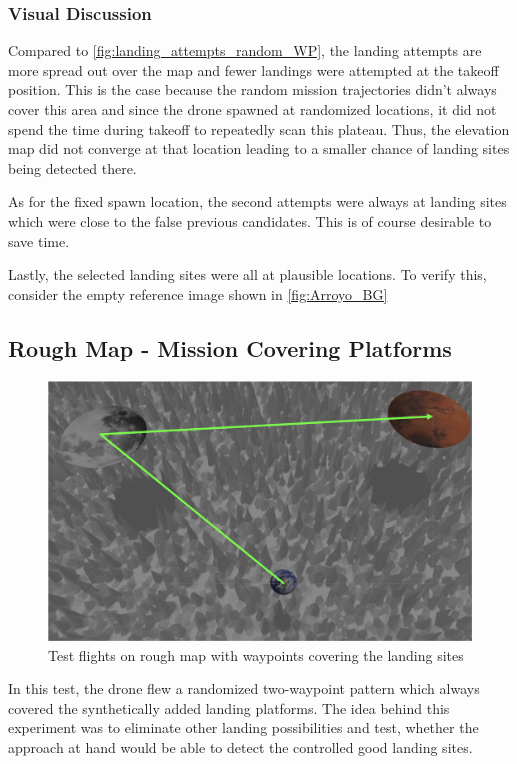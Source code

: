     \subsubsection{Visual Discussion}
    Compared to \cref{fig:landing_attempts_random_WP}, the landing attempts are more spread out over the map and fewer landings were attempted at the takeoff position. This is the case because the random mission trajectories didn't always cover this area and since the drone spawned at randomized locations, it did not spend the time during takeoff to repeatedly scan this plateau. Thus, the elevation map did not converge at that location leading to a smaller chance of landing sites being detected there. 
    
    As for the fixed spawn location, the second attempts were always at landing sites which were close to the false previous candidates. This is of course desirable to save time.

    Lastly, the selected landing sites were all at plausible locations. To verify this, consider the empty reference image shown in \cref{fig:Arroyo_BG}

\subsection{Rough Map - Mission Covering Platforms}\label{subsec:rough_coverage}
        \begin{figure}[h]
            \centering
            \includegraphics[scale=0.24]{images/evaluation/rough_over_platforms.png}
            \caption{Test flights on rough map with waypoints covering the landing sites}
            \label{fig:rough_covered}
        \end{figure}

        In this test, the drone flew a randomized two-waypoint pattern which always covered the synthetically added landing platforms. The idea behind this experiment was to eliminate other landing possibilities and test, whether the approach at hand would be able to detect the controlled good landing sites.

